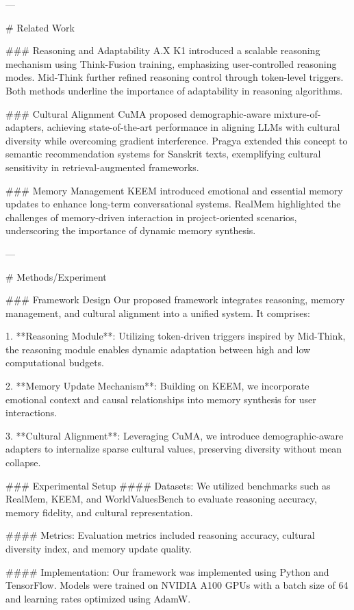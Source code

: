 ---

# Related Work

### Reasoning and Adaptability
A.X K1 introduced a scalable reasoning mechanism using Think-Fusion training, emphasizing user-controlled reasoning modes. Mid-Think further refined reasoning control through token-level triggers. Both methods underline the importance of adaptability in reasoning algorithms.

### Cultural Alignment
CuMA proposed demographic-aware mixture-of-adapters, achieving state-of-the-art performance in aligning LLMs with cultural diversity while overcoming gradient interference. Pragya extended this concept to semantic recommendation systems for Sanskrit texts, exemplifying cultural sensitivity in retrieval-augmented frameworks.

### Memory Management
KEEM introduced emotional and essential memory updates to enhance long-term conversational systems. RealMem highlighted the challenges of memory-driven interaction in project-oriented scenarios, underscoring the importance of dynamic memory synthesis.

---

# Methods/Experiment

### Framework Design
Our proposed framework integrates reasoning, memory management, and cultural alignment into a unified system. It comprises:

1. **Reasoning Module**:
   Utilizing token-driven triggers inspired by Mid-Think, the reasoning module enables dynamic adaptation between high and low computational budgets. 

2. **Memory Update Mechanism**:
   Building on KEEM, we incorporate emotional context and causal relationships into memory synthesis for user interactions.

3. **Cultural Alignment**:
   Leveraging CuMA, we introduce demographic-aware adapters to internalize sparse cultural values, preserving diversity without mean collapse.

### Experimental Setup
#### Datasets:
We utilized benchmarks such as RealMem, KEEM, and WorldValuesBench to evaluate reasoning accuracy, memory fidelity, and cultural representation.

#### Metrics:
Evaluation metrics included reasoning accuracy, cultural diversity index, and memory update quality.

#### Implementation:
Our framework was implemented using Python and TensorFlow. Models were trained on NVIDIA A100 GPUs with a batch size of 64 and learning rates optimized using AdamW.


